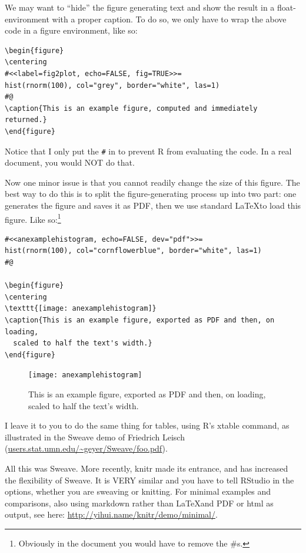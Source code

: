 \documentclass[11pt, a4paper]{article}\usepackage[]{graphicx}\usepackage[]{color}
\begin{document}
We may want to ``hide'' the figure generating text and show the result in a float-environment with a proper caption. To do so, we only have to wrap the above code in a figure environment, like so:
\begin{verbatim}
\begin{figure}
\centering
#<<label=fig2plot, echo=FALSE, fig=TRUE>>=
hist(rnorm(100), col="grey", border="white", las=1)
#@
\caption{This is an example figure, computed and immediately returned.}
\end{figure}
\end{verbatim}
Notice that I only put the \texttt{\#} in to prevent R from evaluating the code. In a real document, you would NOT do that.

Now one minor issue is that you cannot readily change the size of this figure. The best way to do this is to split the figure-generating process up into two part: one generates the figure and saves it as PDF, then we use standard \LaTeX\/to load this figure. Like so:\footnote{Obviously in the document you would have to remove the \#s.}
\begin{verbatim}
#<<anexamplehistogram, echo=FALSE, dev="pdf">>=
hist(rnorm(100), col="cornflowerblue", border="white", las=1)
#@

\begin{figure}
\centering
\texttt{[image: anexamplehistogram]}
\caption{This is an example figure, exported as PDF and then, on loading, 
  scaled to half the text's width.}
\end{figure}
\end{verbatim}

\begin{figure}
\centering
\texttt{[image: anexamplehistogram]}
\captionsetup{width=0.8\textwidth}
\caption{This is an example figure, exported as PDF and then, on loading, scaled to half the text's width.}
\end{figure}


\medskip

I leave it to you to do the same thing for tables, using R's xtable command, as illustrated in the Sweave demo of Friedrich Leisch (\url{users.stat.umn.edu/~geyer/Sweave/foo.pdf}).


All this was Sweave. More recently, knitr made its entrance, and has increased the flexibility of Sweave. It is VERY similar and you have to tell RStudio in the options, whether you are sweaving or knitting. For minimal examples and comparisons, also using markdown rather than \LaTeX\/and PDF or html as output, see here: \url{http://yihui.name/knitr/demo/minimal/}.
\end{document}
